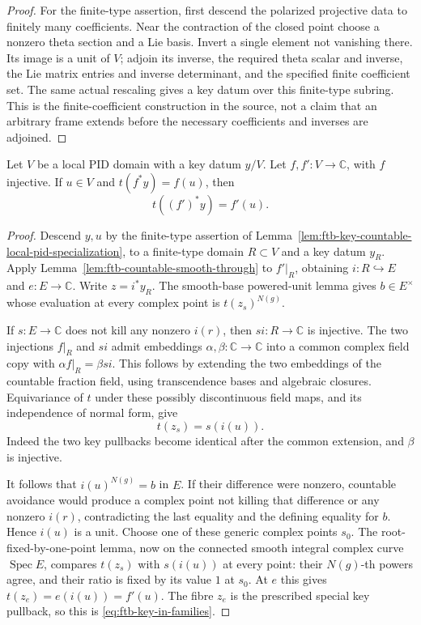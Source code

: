 \begin{proof}
For the finite-type assertion, first descend the polarized
projective data to finitely many coefficients.
Near the contraction of the closed point choose a
nonzero theta section and a Lie basis.
Invert a single element not vanishing there.
Its image is a unit of \(V\); adjoin its inverse, the
required theta scalar and inverse, the Lie matrix entries
and inverse determinant, and the specified finite
coefficient set.
The same actual rescaling gives a key datum over this
finite-type subring.
This is the finite-coefficient construction in the source,
not a claim that an arbitrary frame extends before the
necessary coefficients and inverses are adjoined.
\end{proof}

\begin{srproposition}
\label{prop:ftb-key-normal-value-specializes}
Let \(V\) be a local PID domain with a key datum \(y/V\).
Let \(f,f':V\to\mathbb C\), with \(f\) injective.
If \(u\in V\) and \(t(f^*y)=f(u)\), then
\[
                                t((f')^*y)=f'(u).
 \tag{S3}\label{eq:ftb-key-in-families}
\]
\end{srproposition}
\begin{proof}
Descend \(y,u\) by the finite-type assertion of
Lemma~\ref{lem:ftb-key-countable-local-pid-specialization}, to a finite-type
domain \(R\subset V\) and a key datum \(y_R\).
Apply Lemma~\ref{lem:ftb-countable-smooth-through} to
\(f'|_R\), obtaining \(i:R\hookrightarrow E\) and \(e:E\to\mathbb C\).
Write \(z=i^*y_R\).
The smooth-base powered-unit lemma gives
\(b\in E^\times\) whose evaluation at every complex point is
\(t(z_s)^{N(g)}\).

If \(s:E\to\mathbb C\) does not kill any nonzero \(i(r)\),
then \(si:R\to\mathbb C\) is injective.
The two injections \(f|_R\) and \(si\) admit embeddings
\(\alpha,\beta:\mathbb C\to\mathbb C\) into a common
complex field copy with
\(\alpha f|_R=\beta si\).
This follows by extending the two embeddings of the
countable fraction field, using transcendence bases and
algebraic closures.
Equivariance of \(t\) under these possibly discontinuous
field maps, and its independence of normal form, give
\[
                              t(z_s)=s(i(u)).
\]
Indeed the two key pullbacks become identical after the
common extension, and \(\beta\) is injective.

It follows that \(i(u)^{N(g)}=b\) in \(E\).
If their difference were nonzero, countable avoidance
would produce a complex point not killing that
difference or any nonzero \(i(r)\), contradicting the
last equality and the defining equality for \(b\).
Hence \(i(u)\) is a unit.
Choose one of these generic complex points \(s_0\).
The root-fixed-by-one-point lemma, now on the connected
smooth integral complex curve \(\operatorname{Spec}E\),
compares \(t(z_s)\) with \(s(i(u))\) at every point:
their \(N(g)\)-th powers agree, and their ratio is fixed
by its value \(1\) at \(s_0\).
At \(e\) this gives \(t(z_e)=e(i(u))=f'(u)\).
The fibre \(z_e\) is the prescribed special key pullback,
so this is \eqref{eq:ftb-key-in-families}.
\end{proof}

